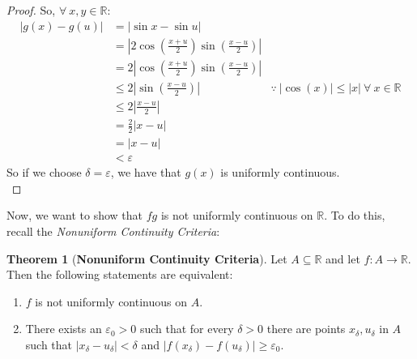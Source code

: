 \documentclass[12pt,letterpaper]{article}
\newcommand{\abs}[1]{\left\lvert #1 \right\rvert}
\newcommand{\R}{\mathbb{R}}
\theoremstyle{case}
\theoremstyle{definition}
\newtheorem*{theorem*}{Theorem}
\begin{document}
\begin{enumerate}
\begin{enumerate}
\begin{proof}
				So, $\forall\ x,y \in \R$:
				\begin{align*}
					|g(x)-g(u)| &= |\sin x - \sin u|\\
					&=\abs{2 \cos \left(\frac{x+u}{2}\right) \sin \left(\frac{x-u}{2}\right)} \\
					&=2 \abs{\cos \left(\frac{x+u}{2}\right) \sin \left(\frac{x-u}{2}\right)} \\
					&\leq 2 \abs{\sin \left(\frac{x-u}{2}\right)} & \because\ |\cos (x)| \leq |x|\ \forall\ x \in \R \\
					&\leq 2 \abs{\frac{x-u}{2}} \\
					&= \frac{2}{2} |x-u| \\
					&= |x-u| \\
					&< \varepsilon
				\end{align*}
				So if we choose $\delta = \varepsilon$, we have that $g(x)$ is uniformly continuous.\\
			\end{proof}
			
			Now, we want to show that $fg$ is not uniformly continuous on $\R$. To do this, recall the \textit{Nonuniform Continuity Criteria}:
			\begin{theorem*}[\textbf{Nonuniform Continuity Criteria}]
				Let $A \subseteq \R$ and let $f:A \rightarrow \R$. Then the following statements are equivalent:
				\begin{enumerate}
					\item $f$ is not uniformly continuous on $A$.
					
					\item There exists an $\varepsilon_0 > 0$ such that for every $\delta > 0$ there are points $x_\delta, u_\delta$ in $A$ such that $|x_\delta - u_\delta|<\delta$ and $|f(x_\delta) - f(u_\delta)| \geq \varepsilon_0$.
					

\end{enumerate}
\end{theorem*}
\end{enumerate}
\end{enumerate}
\end{document}
